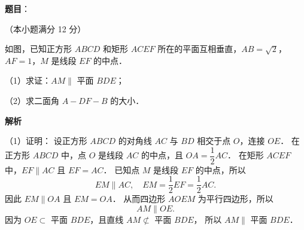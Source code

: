 \begin{answer}

\textbf{题目}：

（本小题满分 12 分）

如图，已知正方形 $ABCD$ 和矩形 $ACEF$ 所在的平面互相垂直，$AB = \sqrt{2}$，$AF = 1$，$M$ 是线段 $EF$ 的中点．

（1）求证：$AM \parallel$ 平面 $BDE$；

（2）求二面角 $A - DF - B$ 的大小．
\nopagebreak[4]
\begin{center}\end{center}
\nopagebreak[4]
\textbf{解析}
\nopagebreak[4]
\begin{center}\end{center}
\nopagebreak[4]
（1）证明：
设正方形 $ABCD$ 的对角线 $AC$ 与 $BD$ 相交于点 $O$，连接 $OE$．
在正方形 $ABCD$ 中，点 $O$ 是线段 $AC$ 的中点，且 $OA = \dfrac{1}{2}AC$．
在矩形 $ACEF$ 中，$EF \parallel AC$ 且 $EF = AC$．
已知点 $M$ 是线段 $EF$ 的中点，所以
\nopagebreak[4]
\[
EM \parallel AC, \quad EM = \frac{1}{2}EF = \frac{1}{2}AC.
\]
因此 $EM \parallel OA$ 且 $EM = OA$．
从而四边形 $AOEM$ 为平行四边形，所以
\nopagebreak[4]
\[
AM \parallel OE.
\]
因为 $OE \subset$ 平面 $BDE$，且直线 $AM \not\subset$ 平面 $BDE$，
所以 $AM \parallel$ 平面 $BDE$．


\end{answer}
